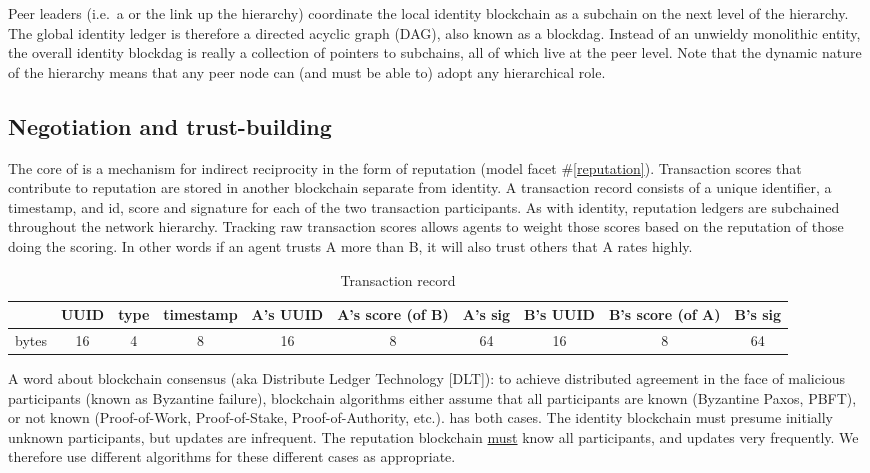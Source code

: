 Peer leaders (i.e.\ a or the link up the hierarchy) coordinate the local identity blockchain as a subchain on the next level of the hierarchy.
The global identity ledger is therefore a directed acyclic graph (DAG), also known as a blockdag.
Instead of an unwieldy monolithic entity, the overall identity blockdag is really a collection of pointers to subchains, all of which live at the peer level.
Note that the dynamic nature of the hierarchy means that any peer node can (and must be able to) adopt any hierarchical role.

\begin{ppl}

\end{ppl}


\subsection{Negotiation and trust-building}\label{subsec:negotiation}

The core of \projectName is a mechanism for indirect reciprocity in the form of reputation (model facet \#\ref{reputation}).
Transaction scores that contribute to reputation are stored in another blockchain separate from identity.
A transaction record consists of a unique identifier, a timestamp, and id, score and signature for each of the two transaction participants.
As with identity, reputation ledgers are subchained throughout the network hierarchy.
Tracking raw transaction scores allows agents to weight those scores based on the reputation of those doing the scoring.
In other words if an agent trusts A more than B, it will also trust others that A rates highly.

\begin{table}[h!]
	\centering
	\begin{tabular}{ |l||c|c|c|c|c|c|c|c|c| }
		\hline
		& UUID & type & timestamp & A's UUID  & A's score (of B) & A's sig & B's UUID &  B's score (of A) & B's sig \\
		\hline
		bytes & 16 & 4 & 8 & 16 & 8 & 64 & 16 & 8 & 64 \\
		\hline
	\end{tabular}
	\caption{Transaction record}
	\label{tab:reputation}
\end{table}

A word about blockchain consensus (aka Distribute Ledger Technology [DLT]): to achieve distributed agreement in the face of malicious participants (known as Byzantine failure), blockchain algorithms either assume that all participants are known (Byzantine Paxos, PBFT), or not known (Proof-of-Work, Proof-of-Stake, Proof-of-Authority, etc.).
\projectName has both cases.
The identity blockchain must presume initially unknown participants, but updates are infrequent.
The reputation blockchain \underline{must} know all participants, and updates very frequently.
We therefore use different algorithms for these different cases as appropriate.

